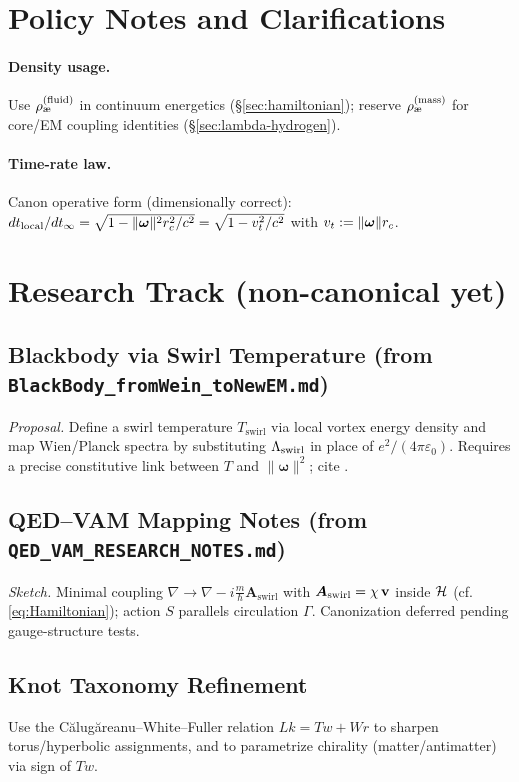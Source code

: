 \documentclass[11pt]{article}
\begin{document}
    \section*{Policy Notes and Clarifications}
    \paragraph{Density usage.} Use \(\aeFluid\) in continuum energetics (\S\ref{sec:hamiltonian}); reserve \(\aeMass\) for core/EM coupling identities (\S\ref{sec:lambda-hydrogen}).
    \paragraph{Time-rate law.} Canon operative form (dimensionally correct): \( dt_{\text{local}}/dt_\infty = \sqrt{1-\|\bm{\omega}\|^2 r_c^2 / c^2} = \sqrt{1-v_t^2/c^2}\) with \(v_t:=\|\bm{\omega}\|r_c\).

    \appendix
    \section{Research Track (non-canonical yet)}
    \subsection{Blackbody via Swirl Temperature (from \texttt{BlackBody\_fromWein\_toNewEM.md})}
    \textit{Proposal.} Define a swirl temperature \(T_{\text{swirl}}\) via local vortex energy density and map Wien/Planck spectra by substituting \(\Lambda_{\text{swirl}}\) in place of \(e^2/(4\pi\varepsilon_0)\). Requires a precise constitutive link between \(T\) and \(\|\bm{\omega}\|^2\); cite \cite{Wien1894,Planck1901}.

    \subsection{QED--VAM Mapping Notes (from \texttt{QED\_VAM\_RESEARCH\_NOTES.md})}
    \textit{Sketch.} Minimal coupling \(\nabla\!\to\!\nabla - i\frac{m}{\hbar}\bm{A}_{\text{swirl}}\) with \(\bm{A}_{\text{swirl}}=\chi\,\vb v\) inside \(\mathcal{H}\) (cf. \eqref{eq:Hamiltonian}); action \(S\) parallels circulation \(\Gamma\). Canonization deferred pending gauge-structure tests.

    \subsection{Knot Taxonomy Refinement}
    Use the Călugăreanu–White–Fuller relation \(Lk=Tw+Wr\) \cite{Calugareanu1961,White1969} to sharpen torus/hyperbolic assignments, and to parametrize chirality (matter/antimatter) via sign of \(Tw\).
\end{document}

